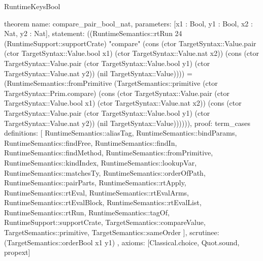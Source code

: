 \begin{lexlean}{RuntimeKeysBool}
\begin{semanticmodule}
theorem{
  name: compare_pair_bool_nat,
  parameters: [x1 : Bool, y1 : Bool, x2 : Nat, y2 : Nat],
  statement: ((RuntimeSemantics::rtRun 24 (RuntimeSupport::supportCrate) "compare" (cons (ctor TargetSyntax::Value.pair (ctor TargetSyntax::Value.bool x1) (ctor TargetSyntax::Value.nat x2)) (cons (ctor TargetSyntax::Value.pair (ctor TargetSyntax::Value.bool y1) (ctor TargetSyntax::Value.nat y2)) (nil TargetSyntax::Value)))) = (RuntimeSemantics::fromPrimitive (TargetSemantics::primitive (ctor TargetSyntax::Prim.compare) (cons (ctor TargetSyntax::Value.pair (ctor TargetSyntax::Value.bool x1) (ctor TargetSyntax::Value.nat x2)) (cons (ctor TargetSyntax::Value.pair (ctor TargetSyntax::Value.bool y1) (ctor TargetSyntax::Value.nat y2)) (nil TargetSyntax::Value)))))),
  proof: term_cases{
    definitions: [
      RuntimeSemantics::aliasTag,
      RuntimeSemantics::bindParams,
      RuntimeSemantics::findFree,
      RuntimeSemantics::findIn,
      RuntimeSemantics::findMethod,
      RuntimeSemantics::fromPrimitive,
      RuntimeSemantics::kindIndex,
      RuntimeSemantics::lookupVar,
      RuntimeSemantics::matchesTy,
      RuntimeSemantics::orderOfPath,
      RuntimeSemantics::pairParts,
      RuntimeSemantics::rtApply,
      RuntimeSemantics::rtEval,
      RuntimeSemantics::rtEvalArms,
      RuntimeSemantics::rtEvalBlock,
      RuntimeSemantics::rtEvalList,
      RuntimeSemantics::rtRun,
      RuntimeSemantics::tagOf,
      RuntimeSupport::supportCrate,
      TargetSemantics::compareValue,
      TargetSemantics::primitive,
      TargetSemantics::sameOrder
    ],
    scrutinee: (TargetSemantics::orderBool x1 y1)
  },
  axioms: [Classical.choice, Quot.sound, propext]
}


\end{semanticmodule}
\end{lexlean}
